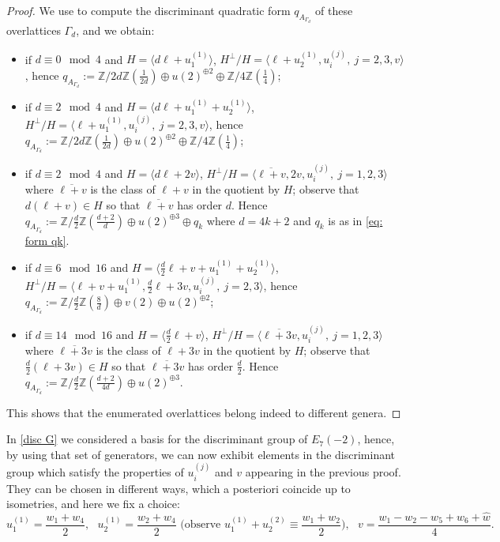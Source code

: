 \documentclass{amsart}
\theoremstyle{definition}
\numberwithin{equation}{section}
\numberwithin{equation}{section} \theoremstyle{definition}
\newcommand\Z{\mathbb{Z}}
\begin{document}
\begin{proof}
We use \cite[Proposition 1.4.1]{N} to compute the discriminant quadratic form $q_{A_{\Gamma_d}}$ of these overlattices $\Gamma_d$, and we obtain:
\begin{itemize}
    \item if $d\equiv 0 \mod 4$ and $H=\langle d\ell+u_1^{(1)}\rangle$, $H^\perp/H =\langle\ell+u_2^{(1)},u_i^{(j)},\ j=2,3,v\rangle$, hence $q_{A_{\Gamma_d}}:=\Z/2d\Z\left(\frac{1}{2d}\right)\oplus u(2)^{\oplus 2}\oplus \Z/4\Z\left(\frac{1}{4}\right) $; 
\item if $d\equiv 2 \mod 4$ and $H=\langle d\ell+u_1^{(1)}+u_2^{(1)}\rangle$, $H^\perp/H =\langle\ell+u_1^{(1)},
u_i^{(j)},\ j=2,3,v\rangle$, hence $q_{A_{\Gamma_d}}:=\Z/2d\Z\left(\frac{1}{2d}\right)\oplus u(2)^{\oplus 2}\oplus \Z/4\Z\left(\frac{1}{4}\right) $;
\item  if $d\equiv 2 \mod 4$ and $H=\langle d\ell+2v\rangle$, $H^\perp/H =\langle\overline{\ell+v},2v,u_i^{(j)},\ j=1,2,3\rangle$ where $\overline{\ell+v}$ is the class of $\ell+v$ in the quotient by $H$; observe that $d(\ell+v)\in H$ so that $\overline{\ell+v}$ has order $d$. Hence $q_{A_{\Gamma_d}}:=\Z/\frac{d}{2}\Z\left(\frac{d+2}{d}\right)\oplus u(2)^{\oplus 3}\oplus q_k$ where $d=4k+2$ and $q_k$ is as in \ref{eq: form qk}.
\item if $d\equiv 6 \mod 16$ and $H=\langle \frac{d}{2}\ell+v+u_1^{(1)}+u_2^{(1)}\rangle$, $H^\perp/H =\langle\ell+v+u_1^{(1)},\frac{d}{2}\ell+3v,u_i^{(j)},\ j=2,3\rangle$, hence $q_{A_{\Gamma_d}}:=\Z/\frac{d}{2}\Z\left(\frac{8}{d}\right)\oplus v(2)\oplus u(2)^{\oplus 2}$;
\item if $d\equiv 14 \mod 16$ and $H=\langle\frac{d}{2}\ell+v\rangle$, $H^\perp/H =\langle\overline{\ell+3v},u_i^{(j)},\ j=1,2,3\rangle$ where $\overline{\ell+3v}$ is the class of $\ell+3v$ in the quotient by $H$; observe that $\frac{d}{2}(\ell+3v)\in H$ so that $\overline{\ell+3v}$ has order $\frac{d}{2}$. Hence $q_{A_{\Gamma_d}}:=\Z/\frac{d}{2}\Z\left(\frac{d+2}{4d}\right)\oplus u(2)^{\oplus 3}$.
\end{itemize}
This shows that the enumerated overlattices belong indeed to different genera.\end{proof}

In \eqref{disc G} we considered a basis for the discriminant group of $E_7(-2)$, hence, by using that set of generators, we can now exhibit elements in the discriminant group which satisfy the properties of $u_i^{(j)}$ and $v$ appearing in the previous proof. They can be chosen in different ways, which a posteriori coincide up to isometries, and here we fix a choice:
\begin{equation}\label{eq: choice of elements in discriminant of G}u_1^{(1)}=\frac{w_1+w_4}{2},\ \ \ u_2^{(1)}=\frac{w_2+w_4}{2} \mbox{ (observe }u_1^{(1)}+u_2^{(2)}\equiv\frac{w_1+w_2}{2}\mbox{)},\ \ \ v=\frac{w_1-w_2-w_5+w_6+\hat{w}}{4}.\end{equation}
\end{document}
